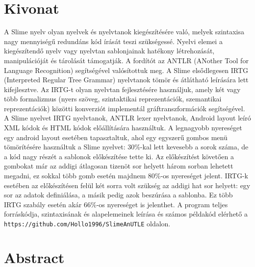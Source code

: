 \setcounter{page}{1}

\selecthungarian

\chapter*{Kivonat}

A Slime nyelv olyan nyelvek és nyelvtanok kiegészítésére való, melyek szintaxisa nagy mennyiségű redundáns kód írását teszi szükségessé. 
Nyelvi elemei a kiegészítendő nyelv vagy nyelvtan sablonjainak hatékony létrehozását, manipulációját és tárolását támogatják. 
A fordítót az ANTLR (ANother Tool for Language Recognition) segítségével valósítottuk meg. 
A Slime elsődlegesen IRTG (Interpreted Regular Tree Grammar) nyelvtanok tömör és átlátható leírására lett kifejlesztve. 
Az IRTG-t olyan nyelvtan fejlesztésére használjuk, amely két vagy több formalizmus (nyers szöveg, szintaktikai reprezentációk, szemantikai reprezentációk) közötti konverziót implementál gráftranszformációk segítségével. 
A Slime nyelvet IRTG nyelvtanok, ANTLR lexer nyelvtanok,  Android layout leíró XML kódok és HTML kódok előállítására használtuk. 
A legnagyobb nyereséget egy android layout esetében tapasztaltuk, ahol egy egyszerű gombos menü tömörítésére használtuk a Slime nyelvet: 30\%-kal lett kevesebb a sorok száma, de a kód nagy részét a sablonok előkészítése tette ki. Az előkészítést követően a gombokat már az addigi átlagosan tizenöt sor helyett három sorban lehetett megadni, ez sokkal több gomb esetén majdnem 80\%-os nyereséget jelent.
IRTG-k esetében az előkészítésen felül két sorra volt szükség az addigi hat sor helyett: egy sor az adatok definiálása, a másik pedig azok beszúrása a sablonba. Ez több IRTG szabály esetén akár 66\%-os nyereséget is jelenthet.
A program teljes forráskódja, szintaxisának és alapelemeinek leírása és számos példakód elérhető a \texttt{https://github.com/Hollo1996/SlimeAnUTLE} oldalon.

\vfill
\selectenglish


\chapter*{Abstract}

